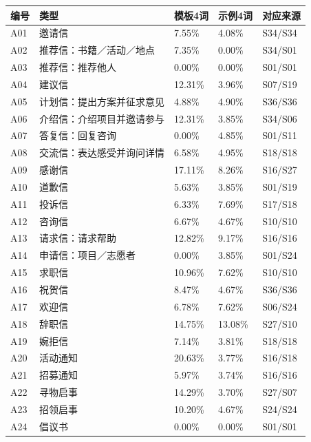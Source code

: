\documentclass[11pt,a4paper,fontset=macnew]{ctexart}
\begin{document}
\clearpage\par\vspace{4pt}{\bfseries 逐篇最高覆盖率（分别与每一份来源比较）}\par\nopagebreak
{\small
\begin{longtable}{L{13mm}L{67mm}L{20mm}L{20mm}L{25mm}}\toprule
\textbf{编号} & \textbf{类型} & \textbf{模板4词} & \textbf{示例4词} & \textbf{对应来源}\\\midrule\endhead
A01 & 邀请信 & 7.55\% & 4.08\% & S34/S34\\
A02 & 推荐信：书籍／活动／地点 & 7.35\% & 0.00\% & S34/S01\\
A03 & 推荐信：推荐他人 & 0.00\% & 0.00\% & S01/S01\\
A04 & 建议信 & 12.31\% & 3.96\% & S07/S19\\
A05 & 计划信：提出方案并征求意见 & 4.88\% & 4.90\% & S36/S36\\
A06 & 介绍信：介绍项目并邀请参与 & 12.31\% & 3.85\% & S34/S06\\
A07 & 答复信：回复咨询 & 0.00\% & 4.85\% & S01/S11\\
A08 & 交流信：表达感受并询问详情 & 6.58\% & 4.95\% & S18/S18\\
A09 & 感谢信 & 17.11\% & 8.26\% & S16/S27\\
A10 & 道歉信 & 5.63\% & 3.85\% & S01/S19\\
A11 & 投诉信 & 6.33\% & 7.69\% & S17/S18\\
A12 & 咨询信 & 6.67\% & 4.67\% & S10/S10\\
A13 & 请求信：请求帮助 & 12.82\% & 9.17\% & S16/S16\\
A14 & 申请信：项目／志愿者 & 0.00\% & 3.85\% & S01/S24\\
A15 & 求职信 & 10.96\% & 7.62\% & S10/S10\\
A16 & 祝贺信 & 8.47\% & 4.67\% & S36/S36\\
A17 & 欢迎信 & 6.78\% & 7.62\% & S06/S24\\
A18 & 辞职信 & 14.75\% & 13.08\% & S27/S10\\
A19 & 婉拒信 & 7.14\% & 3.81\% & S18/S18\\
A20 & 活动通知 & 20.63\% & 3.77\% & S16/S18\\
A21 & 招募通知 & 5.97\% & 3.74\% & S16/S16\\
A22 & 寻物启事 & 14.29\% & 3.70\% & S27/S07\\
A23 & 招领启事 & 10.20\% & 4.67\% & S24/S24\\
A24 & 倡议书 & 0.00\% & 0.00\% & S01/S01\\

\end{longtable}}
\end{document}
